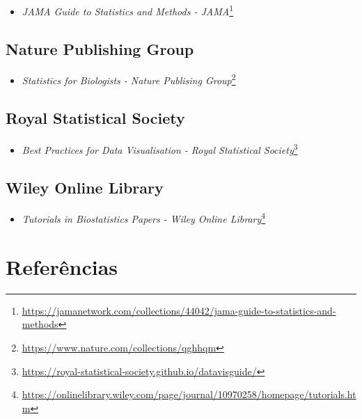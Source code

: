 \documentclass[
  a4paper,
]{book}
\providecommand{\tightlist}{%
  \setlength{\itemsep}{0pt}\setlength{\parskip}{0pt}}
\renewcommand{\href}[2]{#2\footnote{\url{#1}}}
\begin{document}
\begin{itemize}
\tightlist
\item
  \href{https://jamanetwork.com/collections/44042/jama-guide-to-statistics-and-methods}{\emph{JAMA Guide to Statistics and Methods - JAMA}}
\end{itemize}

\hypertarget{nature-publishing-group}{%
\section*{Nature Publishing Group}\label{nature-publishing-group}}

\begin{itemize}
\tightlist
\item
  \href{https://www.nature.com/collections/qghhqm}{\emph{Statistics for Biologists - Nature Publising Group}}
\end{itemize}

\hypertarget{royal-statistical-society}{%
\section*{Royal Statistical Society}\label{royal-statistical-society}}

\begin{itemize}
\tightlist
\item
  \href{https://royal-statistical-society.github.io/datavisguide/}{\emph{Best Practices for Data Visualisation - Royal Statistical Society}}
\end{itemize}

\hypertarget{wiley-online-library}{%
\section*{Wiley Online Library}\label{wiley-online-library}}

\begin{itemize}
\tightlist
\item
  \href{https://onlinelibrary.wiley.com/page/journal/10970258/homepage/tutorials.htm}{\emph{Tutorials in Biostatistics Papers - Wiley Online Library}}
\end{itemize}

\hypertarget{referuxeancias}{%
\chapter*{\texorpdfstring{\textbf{Referências}}{Referências}}\label{referuxeancias}}
\end{document}
